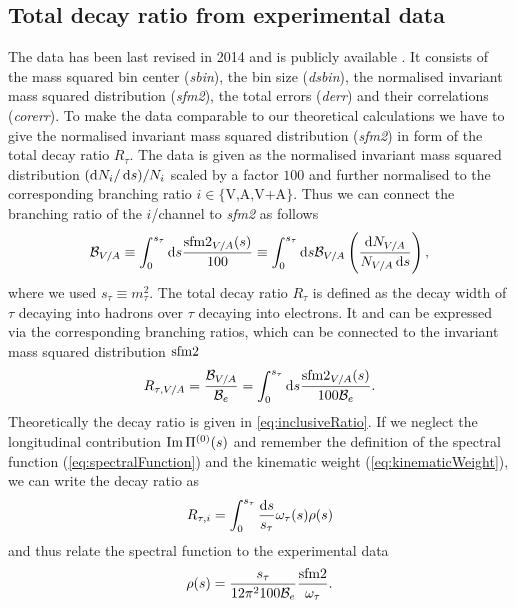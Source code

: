 \documentclass[../../index.tex]{subfiles}
\begin{document}
\subsection{Total decay ratio from experimental data}
The data has been last revised in 2014 \cite{Davier2013} and is publicly
available \cite{AlephData}. It consists of the mass squared bin center
(\textit{sbin}), the bin size (\textit{dsbin}), the normalised invariant mass
squared distribution (\textit{sfm2}), the total errors (\textit{derr}) and their
correlations (\textit{corerr}). To make the data comparable to our theoretical
calculations we have to give the normalised invariant mass squared distribution
(\textit{sfm2}) in form of the total decay ratio \(R_\tau\). The data is given
as the normalised invariant mass squared distribution \((\dif N_i/\dif s)/N_i\)
scaled by a factor \(100\) and further normalised to the corresponding branching
ratio \(i\in\{\text{V,A,V+A}\}\). Thus we can connect the branching ratio of the
\(i\)\-/channel to \textit{sfm2} as follows
\begin{equation}
  \mathcal{B}_{V/A} \equiv \int_0^{s_\tau} \dif s \frac{\sfm2_{V/A}(s)}{100}
  \equiv \int_0^{s_\tau} \dif s \mathcal{B}_{V/A}
  \left( \frac{\dif N_{V/A}}{N_{V/A}\dif s} \right),
\end{equation}
where we used \(s_\tau \equiv m_\tau^2\). The total decay ratio \(R_\tau\) is
defined as the decay width of \(\tau\) decaying into hadrons over \(\tau\)
decaying into electrons. It and can be expressed via the corresponding branching
ratios, which can be connected to the invariant mass squared distribution
\(\sfm2\)
\begin{equation}
  R_{\tau, V/A} = \frac{\mathcal{B}_{V/A}}{\mathcal{B}_e}
  = \int_0^{s_\tau} \dif s \frac{\sfm2_{V/A}(s)}{100 \mathcal{B}_e}.
\end{equation}
Theoretically the decay ratio is given in \cref{eq:inclusiveRatio}. If we
neglect the longitudinal contribution \(\operatorname{Im} \Pi^{(0)}(s)\) and remember the
definition of the spectral function (\cref{eq:spectralFunction}) and the
kinematic weight (\cref{eq:kinematicWeight}), we can write the decay ratio as
\begin{equation}
  R_{\tau, i} = \int_0^{s_\tau} \frac{\dif s}{s_\tau} \omega_\tau(s) \rho(s)
\end{equation}
and thus relate the spectral function to the experimental data
\begin{equation}
  \rho(s) = \frac{s_\tau}{12 \pi^2 100 \mathcal{B}_e} \frac{\sfm2}{\omega_\tau}.
\end{equation}
\end{document}
